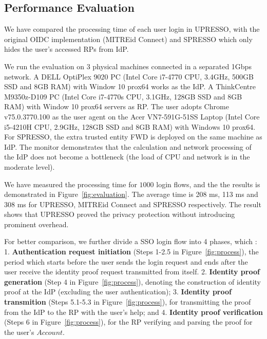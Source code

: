 \subsection{Performance Evaluation}
\label{sec:evaluation}
We have compared the processing time of each user login in UPRESSO, with the original OIDC implementation (MITREid Connect) and SPRESSO which only hides the user's accessed RPs from IdP.

We run the evaluation on 3 physical machines connected in a separated 1Gbps network. A DELL OptiPlex 9020 PC (Intel Core i7-4770 CPU, 3.4GHz, 500GB SSD and 8GB RAM) with Window 10 prox64 works as the IdP. A ThinkCentre M9350z-D109 PC (Intel Core i7-4770s CPU, 3.1GHz, 128GB SSD and 8GB RAM) with  Window 10 prox64 servers as RP. The user adopts Chrome v75.0.3770.100 as the user agent on the Acer VN7-591G-51SS Laptop (Intel Core i5-4210H CPU, 2.9GHz, 128GB SSD and 8GB RAM) with  Windows 10 prox64. For SPRESSO, the extra trusted entity FWD is deployed on the same machine as IdP. 
The monitor demonstrates that the calculation and network processing of the IdP does not become a bottleneck (the load of CPU and network is in the moderate level).

We have measured the processing time for $1000$ login flows, and the the results is demonstrated in Figure~\ref{fig:evaluation}. The average time is 208 ms, 113 ms and 308 ms for UPRESSO, MITREid Connect and SPRESSO respectively. The result shows that UPRESSO proved the privacy protection without introducing prominent overhead.


For better comparison, we further divide a SSO login flow into 4 phases, which : 1. \textbf{Authentication request initiation} (Steps 1-2.5 in Figure~\ref{fig:process}), the period which starts before the user sends the login request and ends after the user receive the identity proof request transmitted from itself.
2. \textbf{Identity proof generation} (Step 4 in Figure~\ref{fig:process}), denoting the construction of identity proof at the IdP (excluding the user authentication); 3. \textbf{Identity proof transmition} (Steps 5.1-5.3 in Figure~\ref{fig:process}), for transmitting the proof from the IdP to the RP with the user's help; and 4. \textbf{Identity proof verification} (Steps 6 in Figure~\ref{fig:process}), for the RP  verifying and parsing the proof for the user's $Account$. 

